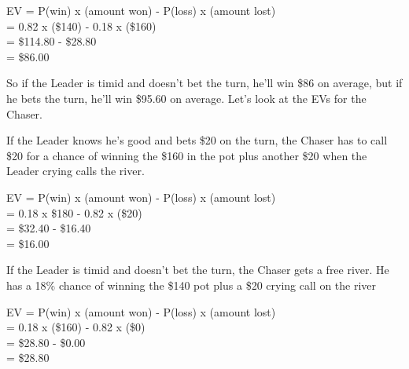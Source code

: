 EV = P(win) x (amount won) - P(loss) x (amount lost) \\
   = 0.82   x (\$140)      - 0.18    x (\$160) \\
   = \$114.80 - \$28.80 \\
   = \$86.00

So if the Leader is timid and doesn't bet the turn, he'll win \$86 on
average, but if he bets the turn, he'll win \$95.60 on average. Let's
look at the EVs for the Chaser.

If the Leader knows he's good and bets \$20 on the turn, the Chaser
has to call \$20 for a chance of winning the \$160 in the pot plus
another \$20 when the Leader crying calls the river.

EV = P(win) x (amount won) - P(loss) x (amount lost) \\
   = 0.18 x \$180 - 0.82 x (\$20) \\
   = \$32.40 - \$16.40 \\
   = \$16.00

If the Leader is timid and doesn't bet the turn, the Chaser gets a
free river. He has a 18\% chance of winning the \$140 pot plus a \$20
crying call on the river

EV = P(win) x (amount won) - P(loss) x (amount lost) \\
   = 0.18 x (\$160) - 0.82 x (\$0) \\
   = \$28.80 - \$0.00 \\
   = \$28.80

